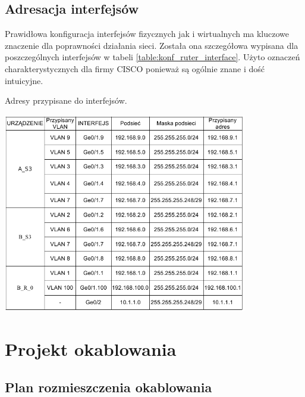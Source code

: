 \documentclass{report}
\begin{document}
\subsection{Adresacja interfejsów }
Prawidłowa konfiguracja interfejsów fizycznych jak i wirtualnych ma kluczowe znaczenie dla poprawności działania sieci. Została ona szczegółowa wypisana
dla poszczególnych interfejsów w tabeli \ref{table:konf_ruter_interface}. Użyto oznaczeń charakterystycznych dla firmy CISCO ponieważ są ogólnie znane i dość 
intuicyjne.
\begin{table}[H]
\caption{Adresy przypisane do interfejsów.}
\label{table:konf_ruter_interface}
 \centering
      \includegraphics[width=0.8\textwidth]{./obrazki/ip/ip_ruter.png}
\end{table}

\section{Projekt okablowania}

\subsection{Plan rozmieszczenia okablowania}
\end{document}
